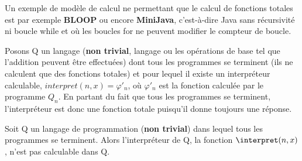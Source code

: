 \begin{myexem}
Un exemple de modèle de calcul ne permettant que le calcul de fonctions totales est par exemple \textbf{BLOOP} ou encore \textbf{MiniJava}, c'est-à-dire Java sans récursivité ni boucle while et où les boucles for ne peuvent modifier le compteur de boucle. 
\end{myexem}

Posons Q un langage (\textbf{non trivial}, langage ou les opérations de base tel que l'addition peuvent être effectuées) dont tous les programmes se terminent (ils ne calculent que des fonctions totales) et pour lequel il existe un interpréteur calculable, $interpret(n,x){} =\varphi'_n$, où 
$\varphi'_n$ est la fonction calculée par le programme $Q_n$. En partant du fait que tous les programmes se terminent, l'interpréteur est donc une fonction totale puisqu'il donne toujours une réponse.

\begin{mytheo}
	\label{Hoare_Allison}
Soit Q un langage de programmation (\textbf{non trivial}) dans lequel tous les programmes se terminent.	Alors l'interpréteur de Q, la fonction $\interpret(n,x)$, n'est pas calculable dans Q.
\end{mytheo}

